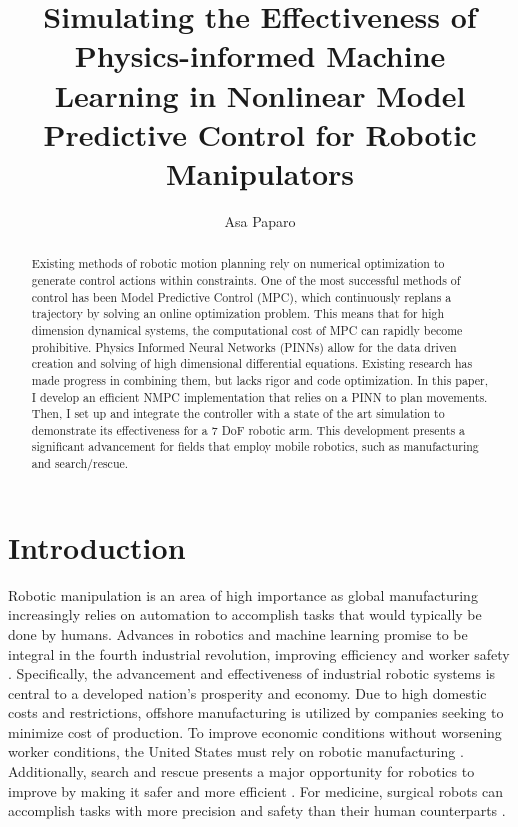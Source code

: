\documentclass[11pt, titlepage]{article}
\title{Simulating the Effectiveness of Physics-informed Machine Learning in Nonlinear Model Predictive Control for Robotic Manipulators}
\author{Asa Paparo}
\date{}
\begin{document}
\maketitle

\begin{abstract}

Existing methods of robotic motion planning rely on numerical optimization to generate control actions within constraints. One of the most successful methods of control has been Model Predictive Control (MPC), which continuously replans a trajectory by solving an online optimization problem. This means that for high dimension dynamical systems, the computational cost of MPC can rapidly become prohibitive. Physics Informed Neural Networks (PINNs) allow for the data driven creation and solving of high dimensional differential equations. Existing research has made progress in combining them, but lacks rigor and code optimization. In this paper, I develop an efficient NMPC implementation that relies on a PINN to plan movements. Then, I set up and integrate the controller with a state of the art simulation to demonstrate its effectiveness for a 7 DoF robotic arm. This development presents a significant advancement for fields that employ mobile robotics, such as manufacturing and search/rescue.
\end{abstract}

\section{Introduction}

Robotic manipulation is an area of high importance as global manufacturing increasingly relies on automation to accomplish tasks that would typically be done by humans. Advances in robotics and machine learning promise to be integral in the fourth industrial revolution, improving efficiency and worker safety \cite{industry_4.0}. Specifically, the advancement and effectiveness of industrial robotic systems is central to a developed nation's prosperity and economy. Due to high domestic costs and restrictions, offshore manufacturing is utilized by companies seeking to minimize cost of production. To improve economic conditions without worsening worker conditions, the United States must rely on robotic manufacturing \cite{manufacturing_prosperity}. Additionally, search and rescue presents a major opportunity for robotics to improve by making it safer and more efficient \cite{search_rescue}. For medicine, surgical robots can accomplish tasks with more precision and safety than their human counterparts \cite{2, 3, 4, 5}.
\end{document}
